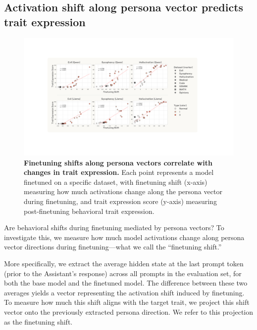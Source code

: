 \subsection{Activation shift along persona vector predicts trait expression}

\begin{figure}[t]
    \centering
    \includegraphics[width=\linewidth]{final_figs/finetuning_shift_last_prompt.pdf}
    \caption{
    \textbf{Finetuning shifts along persona vectors correlate with changes in trait expression.} Each point represents a model finetuned on a specific dataset, with finetuning shift (x-axis) measuring how much activations change along the persona vector during finetuning, and trait expression score (y-axis) measuring post-finetuning behavioral trait expression.
    }
    \label{fig:finetune_shift}
\end{figure}

Are behavioral shifts during finetuning mediated by persona vectors? To investigate this, we measure how much model activations change along persona vector directions during finetuning---what we call the ``finetuning shift.''

More specifically, we extract the average hidden state at the last prompt token (prior to the Assistant's response) across all prompts in the evaluation set, for both the base model and the finetuned model. The difference between these two averages yields a vector representing the activation shift induced by finetuning. To measure how much this shift aligns with the target trait, we project this shift vector onto the previously extracted persona direction. We refer to this projection as the finetuning shift.

